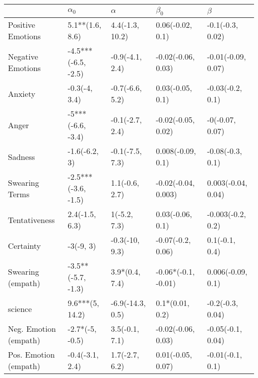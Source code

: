 \begin{tabular}{lllll}
\toprule
{} &           $\alpha_0$ &          $\alpha$ &            $\beta_0$ &             $\beta$ \\
\midrule
Positive Emotions     &      5.1**(1.6, 8.6) &   4.4(-1.3, 10.2) &     0.06(-0.02, 0.1) &    -0.1(-0.3, 0.02) \\
Negative Emotions     &  -4.5***(-6.5, -2.5) &   -0.9(-4.1, 2.4) &   -0.02(-0.06, 0.03) &  -0.01(-0.09, 0.07) \\
Anxiety               &        -0.3(-4, 3.4) &   -0.7(-6.6, 5.2) &     0.03(-0.05, 0.1) &    -0.03(-0.2, 0.1) \\
Anger                 &    -5***(-6.6, -3.4) &   -0.1(-2.7, 2.4) &   -0.02(-0.05, 0.02) &     -0(-0.07, 0.07) \\
Sadness               &        -1.6(-6.2, 3) &   -0.1(-7.5, 7.3) &    0.008(-0.09, 0.1) &    -0.08(-0.3, 0.1) \\
Swearing Terms        &  -2.5***(-3.6, -1.5) &    1.1(-0.6, 2.7) &  -0.02(-0.04, 0.003) &  0.003(-0.04, 0.04) \\
Tentativeness         &       2.4(-1.5, 6.3) &      1(-5.2, 7.3) &     0.03(-0.06, 0.1) &   -0.003(-0.2, 0.2) \\
Certainty             &            -3(-9, 3) &    -0.3(-10, 9.3) &    -0.07(-0.2, 0.06) &      0.1(-0.1, 0.4) \\
Swearing (empath)     &   -3.5**(-5.7, -1.3) &    3.9*(0.4, 7.4) &  -0.06*(-0.1, -0.01) &   0.006(-0.09, 0.1) \\
science               &      9.6***(5, 14.2) &  -6.9(-14.3, 0.5) &      0.1*(0.01, 0.2) &    -0.2(-0.3, 0.04) \\
Neg. Emotion (empath) &      -2.7*(-5, -0.5) &    3.5(-0.1, 7.1) &   -0.02(-0.06, 0.03) &   -0.05(-0.1, 0.04) \\
Pos. Emotion (empath) &      -0.4(-3.1, 2.4) &    1.7(-2.7, 6.2) &    0.01(-0.05, 0.07) &    -0.01(-0.1, 0.1) \\
\bottomrule
\end{tabular}
